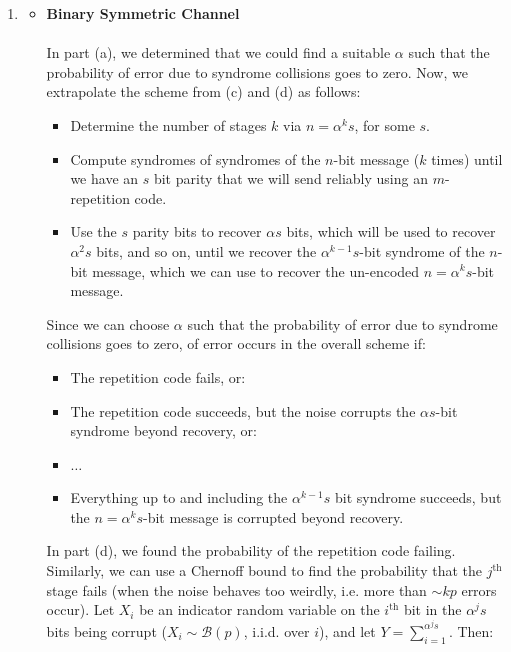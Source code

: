 \documentclass[11pt]{article}
\begin{document}
\begin{enumerate}
\begin{enumerate}
        \item

        \begin{itemize}
            \item
                {\bf Binary Symmetric Channel} \\
                \\
                In part (a), we determined that we could find a suitable $\alpha$ such that the probability of error due to syndrome collisions goes to zero. Now, we extrapolate the scheme from (c) and (d) as follows:
                \begin{itemize}
                    \item Determine the number of stages $k$ via $n = \alpha^k s$, for some $s$.
                    \item Compute syndromes of syndromes of the $n$-bit message ($k$ times) until we have an $s$ bit parity that we will send reliably using an $m$-repetition code.
                    \item Use the $s$ parity bits to recover $\alpha s$ bits, which will be used to recover $\alpha^2 s$ bits, and so on, until we recover the $\alpha^{k - 1} s$-bit syndrome of the $n$-bit message, which we can use to recover the un-encoded $n = \alpha^k s$-bit message.
                \end{itemize}
                Since we can choose $\alpha$ such that the probability of error due to syndrome collisions goes to zero, of error occurs in the overall scheme if:
                \begin{itemize}
                    \item The repetition code fails, or:
                    \item The repetition code succeeds, but the noise corrupts the $\alpha s$-bit syndrome beyond recovery, or:
                    \item $\dotsc$
                    \item Everything up to and including the $\alpha^{k - 1} s$ bit syndrome succeeds, but the $n = \alpha^k s$-bit message is corrupted beyond recovery.
                \end{itemize}
                In part (d), we found the probability of the repetition code failing. Similarly, we can use a Chernoff bound to find the probability that the $j^{\mbox{th}}$ stage fails (when the noise behaves too weirdly, i.e. more than $\sim kp$ errors occur). Let $X_i$ be an indicator random variable on the $i^{\mbox{th}}$ bit in the $\alpha^j s$ bits being corrupt ($X_i\sim\mathcal{B}(p)$, i.i.d. over $i$), and let $Y = \sum_{i = 1}^{\alpha^j s}$. Then:

\end{itemize}
\end{enumerate}
\end{enumerate}
\end{document}
